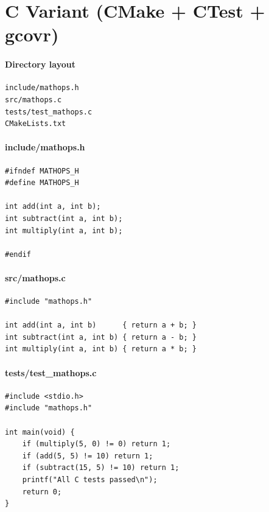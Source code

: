 \documentclass[11pt]{article}
\begin{document}
\section{C Variant (CMake + CTest + gcovr)}
\paragraph{Directory layout}
\begin{verbatim}
include/mathops.h
src/mathops.c
tests/test_mathops.c
CMakeLists.txt
\end{verbatim}

\paragraph{include/mathops.h}
\begin{verbatim}
#ifndef MATHOPS_H
#define MATHOPS_H

int add(int a, int b);
int subtract(int a, int b);
int multiply(int a, int b);

#endif
\end{verbatim}

\paragraph{src/mathops.c}
\begin{verbatim}
#include "mathops.h"

int add(int a, int b)      { return a + b; }
int subtract(int a, int b) { return a - b; }
int multiply(int a, int b) { return a * b; }
\end{verbatim}

\paragraph{tests/test\_mathops.c}
\begin{verbatim}
#include <stdio.h>
#include "mathops.h"

int main(void) {
    if (multiply(5, 0) != 0) return 1;
    if (add(5, 5) != 10) return 1;
    if (subtract(15, 5) != 10) return 1;
    printf("All C tests passed\n");
    return 0;
}
\end{verbatim}
\clearpage
\end{document}
